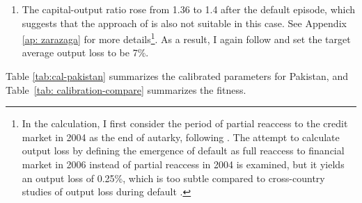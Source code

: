 \begin{enumerate}[label = (\roman*)]
{    }
    \item
    The capital-output ratio rose from 1.36 to 1.4 after the default episode, which suggests that the approach of \citet{zarazaga-12} is also not suitable in this case. See Appendix \ref{ap: zarazaga} for more details\footnote{
        In the calculation, I first consider the period of partial reaccess to the credit market in 2004 as the end of autarky, following \citet{trebesch-2011-sovereign}. The attempt to calculate output loss by defining the emergence of default as full reaccess to financial market in 2006 instead of partial reaccess in 2004 is examined, but it yields an output loss of 0.25\%, which is too subtle compared to cross-country studies of output loss during default \citep{Borensztein-Panizza-defualt-cost}.}.
    As a result, I again follow \citet{Na-18} and set the target average output loss to be 7\%.

\end{enumerate}
Table \ref{tab:cal-pakistan} summarizes the calibrated parameters for Pakistan, and Table~\ref{tab: calibration-compare} summarizes the fitness.
